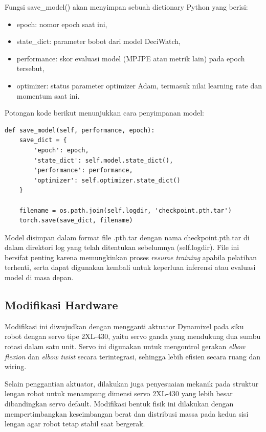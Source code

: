 Fungsi {save\_model()} akan menyimpan sebuah dictionary Python yang berisi:
\begin{itemize}
    \item {epoch}: nomor epoch saat ini,
    \item {state\_dict}: parameter bobot dari model {DeciWatch},
    \item {performance}: skor evaluasi model (MPJPE atau metrik lain) pada epoch tersebut,
    \item {optimizer}: status parameter optimizer {Adam}, termasuk nilai learning rate dan momentum saat ini.
\end{itemize}

Potongan kode berikut menunjukkan cara penyimpanan model:

\begin{lstlisting}[style=plainbox, caption={Penyimpanan checkpoint model setelah setiap epoch}, label={lst:save_model}]
def save_model(self, performance, epoch):
    save_dict = {
        'epoch': epoch,
        'state_dict': self.model.state_dict(),
        'performance': performance,
        'optimizer': self.optimizer.state_dict()
    }

    filename = os.path.join(self.logdir, 'checkpoint.pth.tar')
    torch.save(save_dict, filename)
\end{lstlisting}

Model disimpan dalam format file {.pth.tar} dengan nama {checkpoint.pth.tar} di dalam direktori log yang telah ditentukan sebelumnya ({self.logdir}). File ini bersifat penting karena memungkinkan proses \textit{resume training} apabila pelatihan terhenti, serta dapat digunakan kembali untuk keperluan inferensi atau evaluasi model di masa depan.



\subsection{Modifikasi Hardware}

Modifikasi ini diwujudkan dengan mengganti aktuator Dynamixel pada siku robot dengan servo tipe {2XL-430}, yaitu servo ganda yang mendukung dua sumbu rotasi dalam satu unit. Servo ini digunakan untuk mengontrol gerakan \textit{elbow flexion} dan \textit{elbow twist} secara terintegrasi, sehingga lebih efisien secara ruang dan wiring.

Selain penggantian aktuator, dilakukan juga penyesuaian mekanik pada struktur lengan robot untuk menampung dimensi servo 2XL-430 yang lebih besar dibandingkan servo default. Modifikasi bentuk fisik ini dilakukan dengan mempertimbangkan keseimbangan berat dan distribusi massa pada kedua sisi lengan agar robot tetap stabil saat bergerak.

